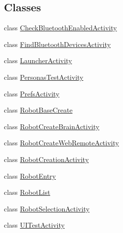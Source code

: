 \subsection*{Classes}
\begin{DoxyCompactItemize}
\item 
class \hyperlink{classcom_1_1cellbots_1_1_check_bluetooth_enabled_activity}{Check\-Bluetooth\-Enabled\-Activity}
\item 
class \hyperlink{classcom_1_1cellbots_1_1_find_bluetooth_devices_activity}{Find\-Bluetooth\-Devices\-Activity}
\item 
class \hyperlink{classcom_1_1cellbots_1_1_launcher_activity}{Launcher\-Activity}
\item 
class \hyperlink{classcom_1_1cellbots_1_1_personas_test_activity}{Personas\-Test\-Activity}
\item 
class \hyperlink{classcom_1_1cellbots_1_1_prefs_activity}{Prefs\-Activity}
\item 
class \hyperlink{classcom_1_1cellbots_1_1_robot_base_create}{Robot\-Base\-Create}
\item 
class \hyperlink{classcom_1_1cellbots_1_1_robot_create_brain_activity}{Robot\-Create\-Brain\-Activity}
\item 
class \hyperlink{classcom_1_1cellbots_1_1_robot_create_web_remote_activity}{Robot\-Create\-Web\-Remote\-Activity}
\item 
class \hyperlink{classcom_1_1cellbots_1_1_robot_creation_activity}{Robot\-Creation\-Activity}
\item 
class \hyperlink{classcom_1_1cellbots_1_1_robot_entry}{Robot\-Entry}
\item 
class \hyperlink{classcom_1_1cellbots_1_1_robot_list}{Robot\-List}
\item 
class \hyperlink{classcom_1_1cellbots_1_1_robot_selection_activity}{Robot\-Selection\-Activity}
\item 
class \hyperlink{classcom_1_1cellbots_1_1_u_i_test_activity}{U\-I\-Test\-Activity}
\end{DoxyCompactItemize}
